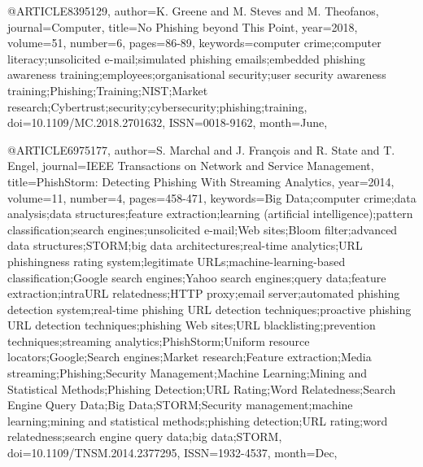 @ARTICLE{8395129,
author={K. Greene and M. Steves and M. Theofanos},
journal={Computer},
title={No Phishing beyond This Point},
year={2018},
volume={51},
number={6},
pages={86-89},
keywords={computer crime;computer literacy;unsolicited e-mail;simulated phishing emails;embedded phishing awareness training;employees;organisational security;user security awareness training;Phishing;Training;NIST;Market research;Cybertrust;security;cybersecurity;phishing;training},
doi={10.1109/MC.2018.2701632},
ISSN={0018-9162},
month={June},}

@ARTICLE{6975177,
author={S. Marchal and J. François and R. State and T. Engel},
journal={IEEE Transactions on Network and Service Management},
title={PhishStorm: Detecting Phishing With Streaming Analytics},
year={2014},
volume={11},
number={4},
pages={458-471},
keywords={Big Data;computer crime;data analysis;data structures;feature extraction;learning (artificial intelligence);pattern classification;search engines;unsolicited e-mail;Web sites;Bloom filter;advanced data structures;STORM;big data architectures;real-time analytics;URL phishingness rating system;legitimate URLs;machine-learning-based classification;Google search engines;Yahoo search engines;query data;feature extraction;intraURL relatedness;HTTP proxy;email server;automated phishing detection system;real-time phishing URL detection techniques;proactive phishing URL detection techniques;phishing Web sites;URL blacklisting;prevention techniques;streaming analytics;PhishStorm;Uniform resource locators;Google;Search engines;Market research;Feature extraction;Media streaming;Phishing;Security Management;Machine Learning;Mining and Statistical Methods;Phishing Detection;URL Rating;Word Relatedness;Search Engine Query Data;Big Data;STORM;Security management;machine learning;mining and statistical methods;phishing detection;URL rating;word relatedness;search engine query data;big data;STORM},
doi={10.1109/TNSM.2014.2377295},
ISSN={1932-4537},
month={Dec},}